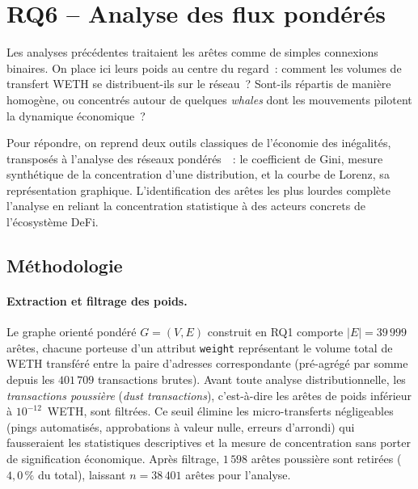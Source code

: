 
\section{RQ6 -- Analyse des flux pond\'er\'es}
\label{sec:rq6}

Les analyses pr\'ec\'edentes traitaient les ar\^etes comme de simples connexions binaires. On place ici leurs poids au centre du regard~: comment les volumes de transfert WETH se distribuent-ils sur le r\'eseau~? Sont-ils r\'epartis de mani\`ere homog\`ene, ou concentr\'es autour de quelques \textit{whales} dont les mouvements pilotent la dynamique \'economique~?

Pour r\'epondre, on reprend deux outils classiques de l'\'economie des in\'egalit\'es, transpos\'es \`a l'analyse des r\'eseaux pond\'er\'es~\cite{newman2018networks}~: le coefficient de Gini, mesure synth\'etique de la concentration d'une distribution, et la courbe de Lorenz, sa repr\'esentation graphique. L'identification des ar\^etes les plus lourdes compl\`ete l'analyse en reliant la concentration statistique \`a des acteurs concrets de l'\'ecosyst\`eme DeFi.

\subsection{M\'ethodologie}
\label{sec:rq6_methodo}

\paragraph{Extraction et filtrage des poids.}
Le graphe orient\'e pond\'er\'e $G = (V, E)$ construit en RQ1 comporte $|E| = 39\,999$ ar\^etes, chacune porteuse d'un attribut \texttt{weight} repr\'esentant le volume total de WETH transf\'er\'e entre la paire d'adresses correspondante (pr\'e-agr\'eg\'e par somme depuis les $401\,709$ transactions brutes). Avant toute analyse distributionnelle, les \textit{transactions poussi\`ere} (\textit{dust transactions}), c'est-\`a-dire les ar\^etes de poids inf\'erieur \`a $10^{-12}$~WETH, sont filtr\'ees. Ce seuil \'elimine les micro-transferts n\'egligeables (pings automatis\'es, approbations \`a valeur nulle, erreurs d'arrondi) qui fausseraient les statistiques descriptives et la mesure de concentration sans porter de signification \'economique. Apr\`es filtrage, $1\,598$ ar\^etes poussi\`ere sont retir\'ees ($4{,}0\,\%$ du total), laissant $n = 38\,401$ ar\^etes pour l'analyse.

